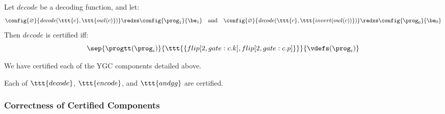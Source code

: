 \begin{definition}
  Let $\mathit{decode}$ be a decoding function, and let:
  $$
  \config{\varnothing}{\mathit{decode}(\ttt{c}, \ttt{owl(c)})}
  \redxs \config{\prog_1}{\be_1}
  \quad \text{and} \quad
  \config{\varnothing}{\mathit{decode}(\ttt{c}, \ttt{invert(owl(c))})}
  \redxs \config{\prog_0}{\be_0}
  $$
  Then $\mathit{decode}$ is certified iff:
  $$
  \sep{\progtt(\prog_i)}{\ttt{\{flip[2,gate:c.k],flip[2,gate:c.p]\}}}{\vdefs(\prog_i)}
  $$
\end{definition}
We have certified each of the YGC components detailed above. 
\begin{lemma}
  \label{lemma-certification}
  Each of $\ttt{decode}$, $\ttt{encode}$, and $\ttt{andgg}$ are certified.
\end{lemma}

\subsubsection{Correctness of Certified Components}
\label{section-composition-metatheory}

